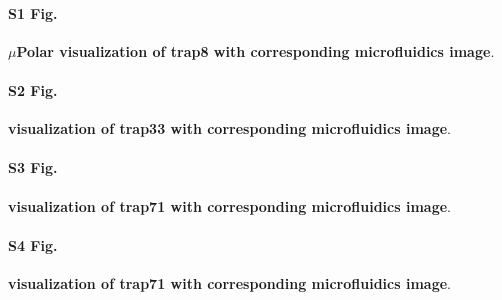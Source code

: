 \documentclass[conference]{IEEEtran}
\begin{document}
\paragraph*{S1 Fig.}
\label{S1_Fig}
{\bf  $\mu$Polar visualization of trap8 with corresponding microfluidics image}. 




\paragraph*{S2 Fig.}
\label{S2_Fig}
{\bf  visualization of trap33 with corresponding microfluidics image}. 




\paragraph*{S3 Fig.}
\label{S3_Fig}
{\bf  visualization of trap71 with corresponding microfluidics image}. 





\paragraph*{S4 Fig.}
\label{S4_Fig}
{\bf visualization of trap71 with corresponding microfluidics image}. 

\end{document}
